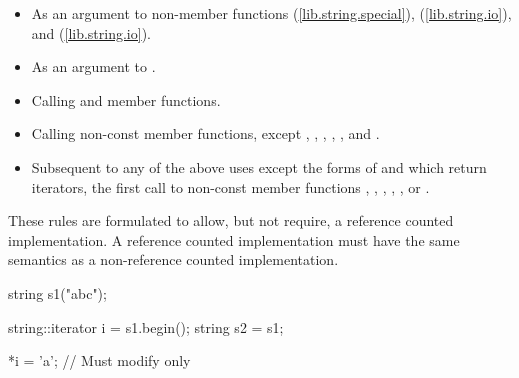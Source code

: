 \begin{itemize}
\item As an argument to non-member functions
 (\ref{lib.string.special}),
 (\ref{lib.string.io}),
and  (\ref{lib.string.io}).
\item As an argument to .
\item Calling  and  member functions.
\item Calling non-const member functions, except ,
, , , , and
.
\item Subsequent to any of the above uses except the forms of 
and  which return iterators, the first call to non-const member
functions , , , ,
, or .
\end{itemize}

\pnum
\enternote
These rules are formulated to allow, but not require, a reference counted
implementation. A reference counted implementation must have the same semantics
as a non-reference counted implementation.
\enterexample

\begin{codeblock}
string s1("abc");

string::iterator i = s1.begin();
string s2 = s1;

*i = 'a';                       // Must modify only 
\end{codeblock}

\exitexampleb
\exitnoteb

